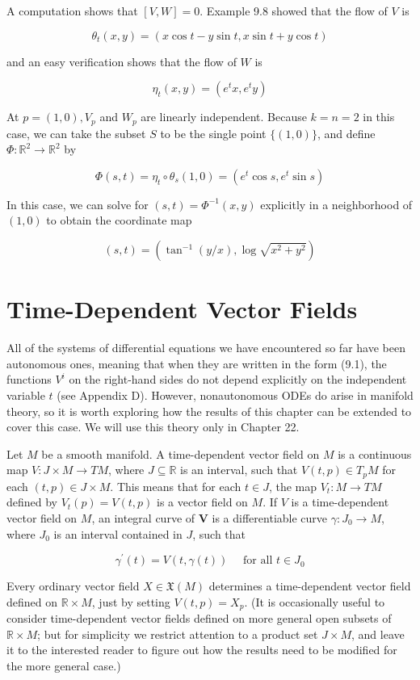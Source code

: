 \documentclass[10pt]{article}
\begin{document}
A computation shows that $[V, W]=0$. Example 9.8 showed that the flow of $V$ is

$$
\theta_{t}(x, y)=(x \cos t-y \sin t, x \sin t+y \cos t)
$$

and an easy verification shows that the flow of $W$ is

$$
\eta_{t}(x, y)=\left(e^{t} x, e^{t} y\right)
$$

At $p=(1,0), V_{p}$ and $W_{p}$ are linearly independent. Because $k=n=2$ in this case, we can take the subset $S$ to be the single point $\{(1,0)\}$, and define $\Phi: \mathbb{R}^{2} \rightarrow \mathbb{R}^{2}$ by

$$
\Phi(s, t)=\eta_{t} \circ \theta_{s}(1,0)=\left(e^{t} \cos s, e^{t} \sin s\right)
$$

In this case, we can solve for $(s, t)=\Phi^{-1}(x, y)$ explicitly in a neighborhood of $(1,0)$ to obtain the coordinate map

$$
(s, t)=\left(\tan ^{-1}(y / x), \log \sqrt{x^{2}+y^{2}}\right)
$$

\section*{Time-Dependent Vector Fields}
All of the systems of differential equations we have encountered so far have been autonomous ones, meaning that when they are written in the form (9.1), the functions $V^{i}$ on the right-hand sides do not depend explicitly on the independent variable $t$ (see Appendix D). However, nonautonomous ODEs do arise in manifold theory, so it is worth exploring how the results of this chapter can be extended to cover this case. We will use this theory only in Chapter 22.

Let $M$ be a smooth manifold. A time-dependent vector field on $M$ is a continuous map $V: J \times M \rightarrow T M$, where $J \subseteq \mathbb{R}$ is an interval, such that $V(t, p) \in T_{p} M$ for each $(t, p) \in J \times M$. This means that for each $t \in J$, the map $V_{t}: M \rightarrow T M$ defined by $V_{t}(p)=V(t, p)$ is a vector field on $M$. If $V$ is a time-dependent vector field on $M$, an integral curve of $\boldsymbol{V}$ is a differentiable curve $\gamma: J_{0} \rightarrow M$, where $J_{0}$ is an interval contained in $J$, such that

$$
\gamma^{\prime}(t)=V(t, \gamma(t)) \quad \text { for all } t \in J_{0}
$$

Every ordinary vector field $X \in \mathfrak{X}(M)$ determines a time-dependent vector field defined on $\mathbb{R} \times M$, just by setting $V(t, p)=X_{p}$. (It is occasionally useful to consider time-dependent vector fields defined on more general open subsets of $\mathbb{R} \times M$; but for simplicity we restrict attention to a product set $J \times M$, and leave it to the interested reader to figure out how the results need to be modified for the more general case.)
\end{document}

